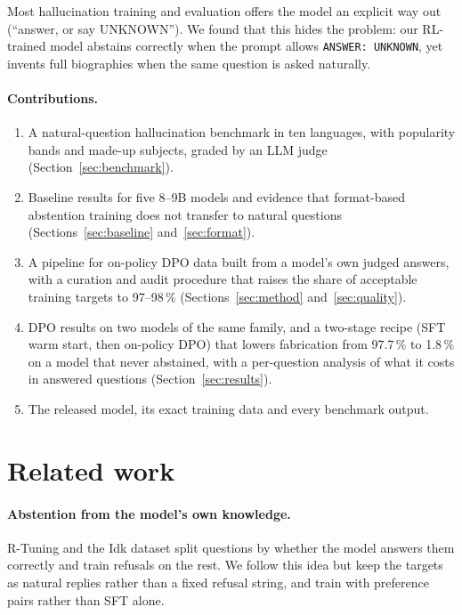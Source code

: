 \documentclass[11pt,a4paper]{article}
\begin{document}
Most hallucination training and evaluation offers the model an explicit way out (``answer, or say UNKNOWN'').
We found that this hides the problem: our RL-trained model abstains correctly when the prompt allows \texttt{ANSWER: UNKNOWN}, yet invents full biographies when the same question is asked naturally.

\paragraph{Contributions.}
\begin{enumerate}
  \item A natural-question hallucination benchmark in ten languages, with popularity bands and made-up subjects, graded by an LLM judge (Section~\ref{sec:benchmark}).
  \item Baseline results for five 8--9B models and evidence that format-based abstention training does not transfer to natural questions (Sections~\ref{sec:baseline} and~\ref{sec:format}).
  \item A pipeline for on-policy DPO data built from a model's own judged answers, with a curation and audit procedure that raises the share of acceptable training targets to 97--98\,\% (Sections~\ref{sec:method} and~\ref{sec:quality}).
  \item DPO results on two models of the same family, and a two-stage recipe (SFT warm start, then on-policy DPO) that lowers fabrication from 97.7\,\% to 1.8\,\% on a model that never abstained, with a per-question analysis of what it costs in answered questions (Section~\ref{sec:results}).
  \item The released model, its exact training data and every benchmark output.
\end{enumerate}

\section{Related work}

\paragraph{Abstention from the model's own knowledge.}
R-Tuning \citep{zhang2024rtuning} and the Idk dataset \citep{cheng2024idk} split questions by whether the model answers them correctly and train refusals on the rest.
We follow this idea but keep the targets as natural replies rather than a fixed refusal string, and train with preference pairs rather than SFT alone.
\end{document}
